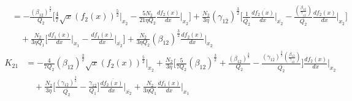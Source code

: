 \documentclass[fleqn, 10pt]{article}
\begin{document}
\begin{equation*}
    \begin{split}
        & = - \frac{(\beta_{12})^\frac{3}{2}}{Q_{2}}    \biggl[ \frac{4}{7} \sqrt{x} (f_{2}(x))^\frac{5}{2} \Bigg|_{x_{2}} - \frac{5N_{2}}{21 \eta Q_{2}}   \frac{df_{2}(x)}{dx} \Bigg|_{x_{2}} \biggr] + \frac{N_{2}}{3 \eta} (\gamma_{1\overline{2}})^\frac{3}{2} \biggl[ \frac{1}{\overline{Q_{2}}}   \frac{d\overline{f_{2}(x)}}{dx} \Bigg|_{\overline{x_{2}}} - \frac{\left( \frac{\beta_{12}}{\gamma_{1\overline{2}}}\right)}{\overline{Q_{2}}}   \frac{df_{2}(x)}{dx} \Bigg|_{x_{2}} \biggr] \\ & \quad + \frac{N_{2}}{3 \eta Q_{1}}   \biggl[ \frac{df_{1}(x)}{dx} \Bigg|_{x_{1}} -   \frac{df_{1}(x)}{dx} \Bigg|_{\overline{x_{2}}} \biggr] + \frac{N_{2}}{3 \eta Q_{2}} (\beta_{12})^\frac{3}{2}   \frac{df_{2}(x)}{dx} \Bigg|_{x_{2}} 
    \end{split}
\end{equation*}
\begin{equation}
\begin{split}
  K_{21}  &= -   \frac{4}{7 Q_{2}} (\beta_{12})^\frac{3}{2} \sqrt{x} (f_{2}(x))^\frac{5}{2} \Bigg|_{x_{2}} + \frac{N_{2}}{3 \eta} \biggl[ \frac{5}{7 Q_{2}} (\beta_{12})^\frac{3}{2} + \frac{(\beta_{12})^\frac{3}{2}}{Q_{2}} - \frac{(\gamma_{1\overline{2}})^\frac{3}{2} \left( \frac{\beta_{12}}{\gamma_{1\overline{2}}}\right)}{\overline{Q_{2}}} \biggr]   \frac{df_{2}(x)}{dx} \Bigg|_{x_{2}} \\ & \quad + \frac{N_{2}}{3 \eta} \biggl[ \frac{(\gamma_{1\overline{2}})^\frac{3}{2}}{\overline{Q_{2}}} - \frac{\gamma_{1\overline{2}}}{Q_{1}}  \biggr]   \frac{d\overline{f_{2}(x)}}{dx} \Bigg|_{\overline{x_{2}}} + \frac{N_{2}}{3 \eta Q_{1}}   \frac{df_{1}(x)}{dx} \Bigg|_{x_{1}}
  \end{split}
\end{equation}
\end{document}
